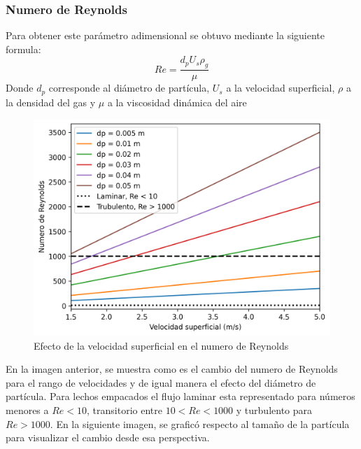\documentclass[12pt,letterpaper,final]{article}%
\begin{document}
\subsubsection{Numero de Reynolds}
Para obtener este parámetro adimensional se obtuvo mediante la siguiente formula:
\begin{equation}\label{Ecu_reynolds}
	Re = \frac{d_p U_s \rho_g}{\mu}
\end{equation}
Donde $d_p$ corresponde al diámetro de partícula, $U_s$ a la velocidad superficial, $\rho$ a la densidad del gas y $\mu$ a la viscosidad dinámica del aire
\begin{figure}[ht!]\label{Reynolds_vs_Us}
	\centering
	\includegraphics[scale=.9]{RevsUs.png}
	\caption{Efecto de la velocidad superficial en el numero de Reynolds}
\end{figure}
\newline
En la imagen anterior, se muestra como es el cambio del numero de Reynolds para el rango de velocidades y de igual manera el efecto del diámetro de partícula. Para lechos empacados el flujo laminar esta representado para números menores a $Re<10$, transitorio entre $10<Re<1000$ y turbulento para $Re>1000$.
En la siguiente imagen, se graficó respecto al tamaño de la partícula para visualizar el cambio desde esa perspectiva. 
\end{document}
